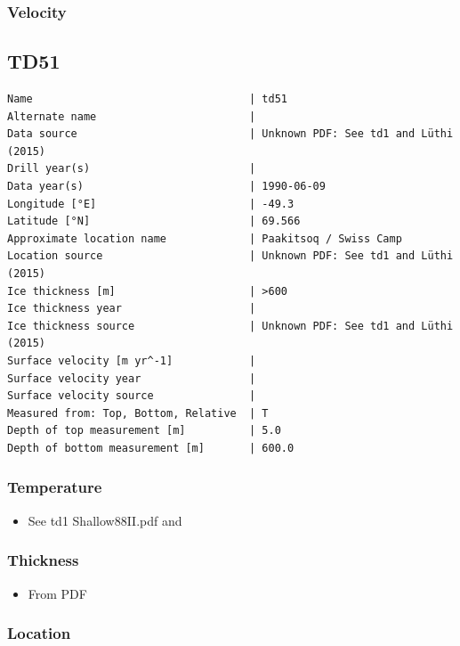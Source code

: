 \documentclass[article,a4paper,times,11pt,twoside]{article}
\begin{document}
\subsubsection{Velocity}
\label{sec:orgb03ee6c}
\clearpage
\subsection{TD51}
\label{sec:orgf7fb67e}
\begin{verbatim}
Name                                  | td51
Alternate name                        | 
Data source                           | Unknown PDF: See td1 and Lüthi (2015)
Drill year(s)                         | 
Data year(s)                          | 1990-06-09
Longitude [°E]                        | -49.3
Latitude [°N]                         | 69.566
Approximate location name             | Paakitsoq / Swiss Camp
Location source                       | Unknown PDF: See td1 and Lüthi (2015)
Ice thickness [m]                     | >600
Ice thickness year                    | 
Ice thickness source                  | Unknown PDF: See td1 and Lüthi (2015)
Surface velocity [m yr^-1]            | 
Surface velocity year                 | 
Surface velocity source               | 
Measured from: Top, Bottom, Relative  | T
Depth of top measurement [m]          | 5.0
Depth of bottom measurement [m]       | 600.0
\end{verbatim}

\subsubsection{Temperature}
\label{sec:org71cb8ea}

\begin{itemize}
\item See td1 Shallow88II.pdf and \textcite{luthi_2015}
\end{itemize}

\subsubsection{Thickness}
\label{sec:org459a59c}

\begin{itemize}
\item From PDF
\end{itemize}

\subsubsection{Location}
\label{sec:orgba8983e}
\end{document}
